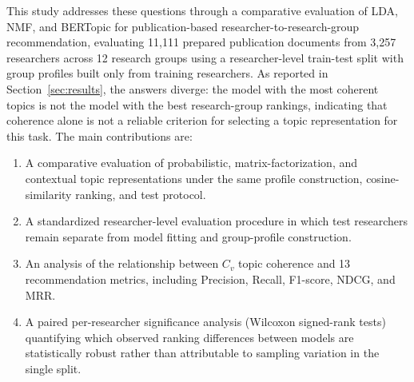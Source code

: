 This study addresses these questions through a comparative evaluation of LDA, NMF, and BERTopic for publication-based researcher-to-research-group recommendation, evaluating 11,111 prepared publication documents from 3,257 researchers across 12 research groups using a researcher-level train-test split with group profiles built only from training researchers. As reported in Section~\ref{sec:results}, the answers diverge: the model with the most coherent topics is not the model with the best research-group rankings, indicating that coherence alone is not a reliable criterion for selecting a topic representation for this task. The main contributions are:
\begin{enumerate}
    \item A comparative evaluation of probabilistic, matrix-factorization, and contextual topic representations under the same profile construction, cosine-similarity ranking, and test protocol.
    \item A standardized researcher-level evaluation procedure in which test researchers remain separate from model fitting and group-profile construction.
    \item An analysis of the relationship between $C_v$ topic coherence and 13 recommendation metrics, including Precision, Recall, F1-score, NDCG, and MRR.
    \item A paired per-researcher significance analysis (Wilcoxon signed-rank tests) quantifying which observed ranking differences between models are statistically robust rather than attributable to sampling variation in the single split.
\end{enumerate}
